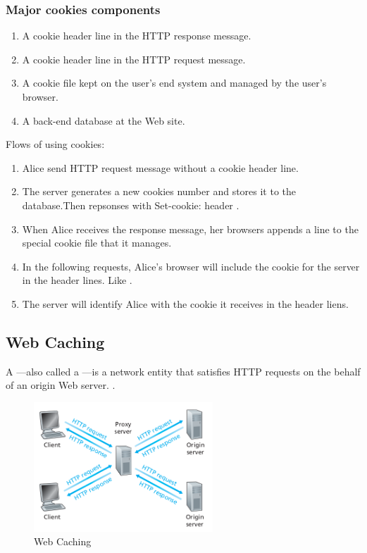 \subsubsection{Major cookies components}
\begin{enumerate}
    \item A cookie header line in the HTTP response message.
    \item A cookie header line in the HTTP request message.
    \item A cookie file kept on the user’s end system and managed by the
          user’s browser.
    \item A back-end database at the Web site.
\end{enumerate}

Flows of using cookies:
\begin{enumerate}
    \item Alice send HTTP request message without a cookie header line.
    \item The server generates a new cookies number and stores it to the database.Then repsonses with Set-cookie: header .
    \item When Alice receives the response message, her browsers appends a line to the special cookie file that it manages.
    \item In the following requests, Alice's browser will include the cookie for the server in the header lines. Like .
    \item The server will identify Alice with the cookie it receives in the header liens.
\end{enumerate}



\subsection{Web Caching}
A —also called a —is a network entity that satisfies HTTP
requests on the behalf of an origin Web server. .

\begin{figure}
    \centering
    \includegraphics[width=0.6\textwidth]{chapters/chapter2/web_cache.png}
    \caption{Web Caching}
    \label{c2_web_caching}
\end{figure}

